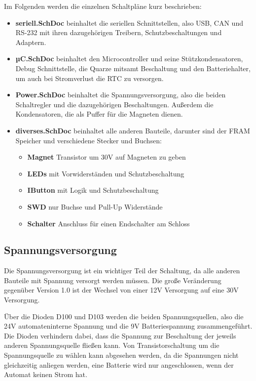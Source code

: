 Im Folgenden werden die einzelnen Schaltpläne kurz beschrieben:
\begin{itemize}
    \item \textbf{seriell.SchDoc} beinhaltet die seriellen Schnittstellen, also \ac{USB}, \ac{CAN} und RS-232 mit ihren
          dazugehörigen Treibern, Schutzbeschaltungen und Adaptern.
    \item \textbf{µC.SchDoc} beinhaltet den Microcontroller und seine Stützkondensatoren, Debug Schnittstelle,
          die Quarze mitsamt Beschaltung und den Batteriehalter, um auch bei Stromverlust die \ac{RTC} zu versorgen.
    \item \textbf{Power.SchDoc} beinhaltet die Spannungsversorgung, also die beiden Schaltregler und die dazugehörigen
          Beschaltungen. Außerdem die Kondensatoren, die als Puffer für die Magneten dienen.
    \item \textbf{diverses.SchDoc} beinhaltet alle anderen Bauteile, darunter sind der \ac{FRAM} Speicher und verschiedene
          Stecker und Buchsen:
          \begin{itemize}
              \item \textbf{Magnet} Transistor um 30V auf Magneten zu geben
              \item \textbf{LEDs} mit Vorwiderständen und Schutzbeschaltung
              \item \textbf{IButton} mit Logik und Schutzbeschaltung
              \item \textbf{SWD} nur Buchse und Pull-Up Widerstände
              \item \textbf{Schalter} Anschluss für einen Endschalter am Schloss
          \end{itemize}

\end{itemize}
\subsection{Spannungsversorgung}
Die Spannungsversorgung ist ein wichtiger Teil der Schaltung, da alle anderen Bauteile mit Spannung versorgt werden müssen.
Die große Veränderung gegenüber Version 1.0 ist der Wechsel von einer 12V Versorgung auf eine 30V Versorgung. 

Über die Dioden D100 und D103 werden die beiden Spannungsquellen, also die 24V automateninterne Spannung und die
9V Batteriespannung zusammengeführt. Die Dioden verhindern dabei, dass die Spannung zur Beschaltung der jeweils anderen
Spannungsquelle fließen kann. Von Transistorschaltung um die Spannungsquelle zu wählen kann abgesehen werden, da die
Spannungen nicht gleichzeitig anliegen werden, eine Batterie wird nur angeschlossen, wenn der Automat keinen Strom hat.

